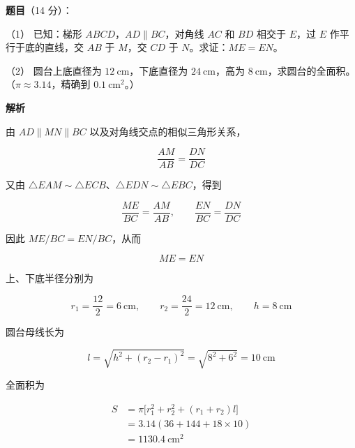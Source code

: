 \begin{answer}

\textbf{题目}（14 分）：

（1） 已知：梯形 $ABCD$，$AD\parallel BC$，对角线 $AC$ 和 $BD$ 相交于 $E$，过 $E$ 作平行于底的直线，交 $AB$ 于 $M$，交 $CD$ 于 $N$。求证：$ME=EN$。
\nopagebreak[4]
\begin{center}\end{center}
\nopagebreak[4]
（2） 圆台上底直径为 $12\ \mathrm{cm}$，下底直径为 $24\ \mathrm{cm}$，高为 $8\ \mathrm{cm}$，求圆台的全面积。（$\pi\approx3.14$，精确到 $0.1\ \mathrm{cm^2}$。）

\textbf{解析}


由 $AD\parallel MN\parallel BC$ 以及对角线交点的相似三角形关系，

\nopagebreak[4]
\[
\frac{AM}{AB}=\frac{DN}{DC}
\]

又由 $\triangle EAM\sim\triangle ECB$、$\triangle EDN\sim\triangle EBC$，得到

\nopagebreak[4]
\[
\frac{ME}{BC}=\frac{AM}{AB},
\qquad
\frac{EN}{BC}=\frac{DN}{DC}
\]

因此 $ME/BC=EN/BC$，从而

\nopagebreak[4]
\[
ME=EN
\]


上、下底半径分别为

\nopagebreak[4]
\[
r_1=\frac{12}{2}=6\ \mathrm{cm},
\qquad
r_2=\frac{24}{2}=12\ \mathrm{cm},
\qquad h=8\ \mathrm{cm}
\]

圆台母线长为

\nopagebreak[4]
\[
l=\sqrt{h^2+(r_2-r_1)^2}=\sqrt{8^2+6^2}=10\ \mathrm{cm}
\]

全面积为

\nopagebreak[4]
\[
\begin{aligned}
S&=\pi\bigl[r_1^2+r_2^2+(r_1+r_2)l\bigr]\\
&=3.14(36+144+18\times10)\\
&=1130.4\ \mathrm{cm^2}
\end{aligned}
\]



\end{answer}
